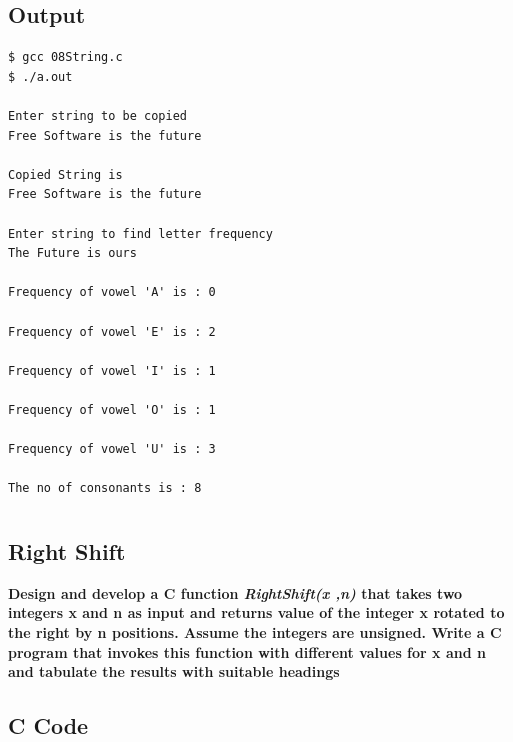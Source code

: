 \documentclass[a4paper]{report}
\begin{document}
\section*{Output}
\begin{Verbatim}
$ gcc 08String.c 
$ ./a.out 

Enter string to be copied
Free Software is the future

Copied String is
Free Software is the future

Enter string to find letter frequency
The Future is ours            

Frequency of vowel 'A' is : 0

Frequency of vowel 'E' is : 2

Frequency of vowel 'I' is : 1

Frequency of vowel 'O' is : 1

Frequency of vowel 'U' is : 3

The no of consonants is : 8
\end{Verbatim}

\chapter{}
\section{Right Shift}
{\selectfont \textbf{Design and develop a C function \textit{RightShift(x ,n)} that takes two integers x and n as input and returns value of the integer x rotated to the right by n positions. Assume the integers are unsigned. Write a C program that invokes this function with different values for x and n and tabulate the results with suitable headings
}}

\section*{C Code}
\end{document}
